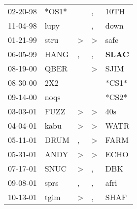 \begin{supertabular}{p{0.07\textwidth}p{0.06\textwidth}p{0.02\textwidth}p{0.02\textwidth}p{0.06\textwidth}}
          02-20-98\textsuperscript{} &                            *OS1* &                  &                , &           10TH\textsuperscript{} \\
          11-04-98\textsuperscript{} &           lupy\textsuperscript{} &                  &                , &           down\textsuperscript{} \\
          01-21-99\textsuperscript{} &           stru\textsuperscript{} &     \textgreater &     \textgreater &           safe\textsuperscript{} \\
          06-05-99\textsuperscript{} &           HANG\textsuperscript{} &                , &                , &  \textbf{SLAC\textsuperscript{}} \\
          08-19-00\textsuperscript{} &           QBER\textsuperscript{} &                  &     \textgreater &           SJIM\textsuperscript{} \\
          08-30-00\textsuperscript{} &            2X2\textsuperscript{} &                  &                  &                            *CS1* \\
          09-14-00\textsuperscript{} &           noqs\textsuperscript{} &                  &                  &                            *CS2* \\
          03-03-01\textsuperscript{} &           FUZZ\textsuperscript{} &     \textgreater &     \textgreater &            40s\textsuperscript{} \\
          04-04-01\textsuperscript{} &           kabu\textsuperscript{} &     \textgreater &     \textgreater &           WATR\textsuperscript{} \\
          05-11-01\textsuperscript{} &           DRUM\textsuperscript{} &                , &     \textgreater &           FARM\textsuperscript{} \\
          05-31-01\textsuperscript{} &           ANDY\textsuperscript{} &     \textgreater &     \textgreater &           ECHO\textsuperscript{} \\
          07-17-01\textsuperscript{} &           SNUC\textsuperscript{} &     \textgreater &                , &            DBK\textsuperscript{} \\
          09-08-01\textsuperscript{} &           sprs\textsuperscript{} &                , &                , &           afri\textsuperscript{} \\
          10-13-01\textsuperscript{} &           tgim\textsuperscript{} &     \textgreater &                , &           SHAF\textsuperscript{} \\

\end{supertabular}
